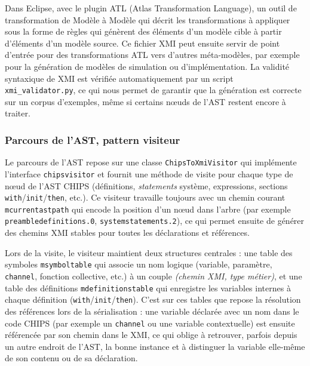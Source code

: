 \documentclass[a4paper, 11pt]{article}
\newcommand{\prog}[1]{\texttt{#1}}
\begin{document}
Dans Eclipse, avec le plugin ATL (Atlas Transformation Language), un outil de transformation de Modèle à Modèle qui décrit les transformations à appliquer sous la forme de règles qui génèrent des éléments d'un modèle cible à partir d'éléments d'un modèle source. Ce fichier XMI peut ensuite servir de point d’entrée pour des transformations ATL vers d’autres méta-modèles, par exemple pour la génération de modèles de simulation ou d’implémentation. La validité syntaxique de XMI est vérifiée automatiquement par un script \prog{xmi\_validator.py}, ce qui nous permet de garantir que la génération est correcte sur un corpus d’exemples, même si certains nœuds de l’AST restent encore à traiter.

\subsubsection{Parcours de l'AST, pattern visiteur}

Le parcours de l’AST repose sur une classe \prog{ChipsToXmiVisitor} qui implémente l’interface \prog{chipsvisitor} et fournit une méthode de visite pour chaque type de nœud de l’AST CHIPS (définitions, \emph{statements} système, expressions, sections \prog{with}/\prog{init}/\prog{then}, etc.). Ce visiteur travaille toujours avec un chemin courant \prog{mcurrentastpath} qui encode la position d’un nœud dans l’arbre (par exemple \prog{preambledefinitions.0}, \prog{systemstatements.2}), ce qui permet ensuite de générer des chemins XMI stables pour toutes les déclarations et références.

Lors de la visite, le visiteur maintient deux structures centrales : une table des symboles \prog{msymboltable} qui associe un nom logique (variable, paramètre, \prog{channel}, fonction collective, etc.) à un couple \emph{(chemin XMI, type métier)}, et une table des définitions \prog{mdefinitionstable} qui enregistre les variables internes à chaque définition (\prog{with}/\prog{init}/\prog{then}). C’est sur ces tables que repose la résolution des références lors de la sérialisation : une variable déclarée avec un nom dans le code CHIPS (par exemple un \prog{channel} ou une variable contextuelle) est ensuite référencée par son chemin dans le XMI, ce qui oblige à retrouver, parfois depuis un autre endroit de l’AST, la bonne instance et à distinguer la variable elle-même de son contenu ou de sa déclaration.
\end{document}
